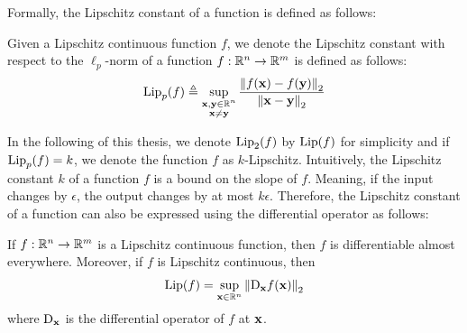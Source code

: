 Formally, the Lipschitz constant of a function is defined as follows: 
\begin{definition} \label{definition:ch3-lipschitz_constant}
  Given a Lipschitz continuous function $f$, we denote the Lipschitz constant with respect to the $\ell_p$-norm of a function $f: \mathbb{R}^n \rightarrow \mathbb{R}^m$ is defined as follows:
  \begin{equation}
  \mathrm{Lip}_{p} (f) \triangleq \sup_{\substack{\mathbf{x}, \mathbf{y} \in \mathbb{R}^n \\ \mathbf{x} \neq \mathbf{y}}} \frac{\norm{f(\mathbf{x}) - f(\mathbf{y})}_2}{\norm{\mathbf{x} - \mathbf{y}}_2}
  \end{equation}
\end{definition}
\noindent
In the following of this thesis, we denote $\mathrm{Lip}_{2} (f)$ by $\mathrm{Lip}(f)$ for simplicity and if $\mathrm{Lip}_{p} (f)=k$, we denote the function $f$ as $k$-Lipschitz.
Intuitively, the Lipschitz constant $k$ of a function $f$ is a bound on the slope of $f$.
Meaning, if the input changes by $\epsilon$, the output changes by at most $k\epsilon$.
Therefore, the Lipschitz constant of a function can also be expressed using the differential operator as follows:
\begin{theorem} \label{theorem:ch3-lipschitz_differential_op}
  If $f: \mathbb{R}^n \rightarrow \mathbb{R}^m$ is a Lipschitz continuous function, then $f$ is differentiable almost everywhere.
  Moreover, if $f$ is Lipschitz continuous, then
  \begin{align}
    \mathrm{Lip}(f) = \sup_{\mathbf{x} \in \mathbb{R}^n} \norm{\mathrm{D}_\mathbf{x} f(\mathbf{x})}_2
  \end{align}
  where $\mathrm{D}_\mathbf{x}$ is the differential operator of $f$ at $\mathbf{x}$.
\end{theorem}

